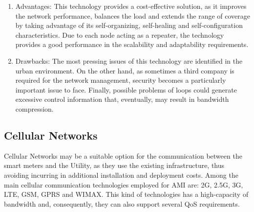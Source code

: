 \documentclass[11pt,final,onecolumn]{IEEEtran}
\begin{document}
\begin{enumerate}
	\item Advantages: This technology provides a cost-effective solution, as it improves the network performance, balances the load and extends the range of coverage by taking advantage of its self-organizing, self-healing and self-configuration characteristics. Due to each node acting as a repeater, the technology provides a good performance in the scalability and adaptability requirements.
	\item Drawbacks: The most pressing issues of this technology are identified in the urban environment. On the other hand, as sometimes a third company is required for the network management, security becomes a particularly important issue to face. Finally, possible problems of loops could generate excessive control information that, eventually, may result in bandwidth compression.
\end{enumerate}

\subsection{Cellular Networks}\label{cellular}
Cellular Networks may be a suitable option for the communication between the smart meters and the Utility, as they use the existing infrastructure, thus avoiding incurring in additional installation and deployment costs. Among the main cellular communication technologies employed for AMI are: 2G, 2.5G, 3G, LTE, GSM, GPRS and WIMAX. This kind of technologies has a high-capacity of bandwidth and, consequently, they can also support several QoS requirements.
\end{document}
